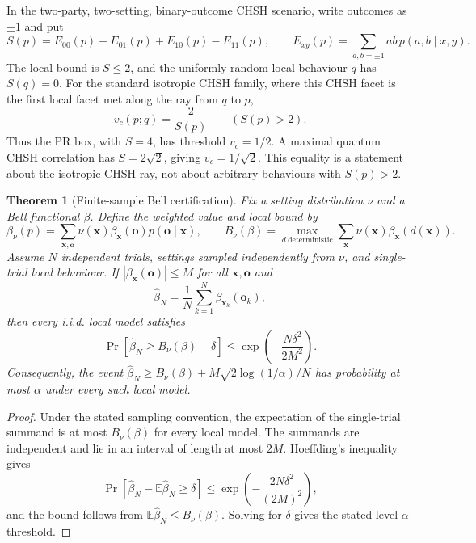 \documentclass[11pt]{article}
\theoremstyle{plain}
\newtheorem{theorem}{Theorem}[section]
\theoremstyle{definition}
\theoremstyle{remark}
\begin{document}
\begin{example}
\label{ex:chsh-visibility}
In the two-party, two-setting, binary-outcome CHSH scenario, write outcomes as
\(\pm1\) and put
\[
S(p)=E_{00}(p)+E_{01}(p)+E_{10}(p)-E_{11}(p),
\qquad
E_{xy}(p)=\sum_{a,b=\pm1}ab\,p(a,b\mid x,y).
\]
The local bound is \(S\le2\), and the uniformly random local behaviour \(q\) has
\(S(q)=0\). For the standard isotropic CHSH family, where this CHSH facet is the
first local facet met along the ray from \(q\) to \(p\),
\[
v_c(p;q)=\frac{2}{S(p)}
\qquad(S(p)>2).
\]
Thus the PR box, with \(S=4\), has threshold \(v_c=1/2\). A maximal quantum CHSH
correlation has \(S=2\sqrt2\), giving \(v_c=1/\sqrt2\). This equality is a
statement about the isotropic CHSH ray, not about arbitrary behaviours with
\(S(p)>2\).
\end{example}

\begin{theorem}[Finite-sample Bell certification]
\label{thm:finite-sample-bell}
Fix a setting distribution \(\nu\) and a Bell functional \(\beta\). Define the
weighted value and local bound by
\[
\beta_\nu(p)=
\sum_{\mathbf x,
\mathbf o}
\nu(\mathbf x)\beta_{\mathbf x}(\mathbf o)p(\mathbf o\mid\mathbf x),
\qquad
B_\nu(\beta)=
\max_{d\ \mathrm{deterministic}}
\sum_{\mathbf x}
\nu(\mathbf x)\beta_{\mathbf x}(d(\mathbf x)).
\]
Assume \(N\) independent trials, settings sampled independently from \(\nu\), and
single-trial local behaviour. If \(|\beta_{\mathbf x}(\mathbf o)|\le M\) for all \(\mathbf x,\mathbf o\) and
\[
\widehat\beta_N=\frac1N\sum_{k=1}^N
\beta_{\mathbf x_k}(\mathbf o_k),
\]
then every i.i.d. local model satisfies
\[
\Pr\!\left[
\widehat\beta_N\ge B_\nu(\beta)+\delta
\right]
\le
\exp\!\left(-\frac{N\delta^2}{2M^2}\right).
\]
Consequently, the event
\(\widehat\beta_N\ge B_\nu(\beta)+M\sqrt{2\log(1/\alpha)/N}\) has probability at
most \(\alpha\) under every such local model.
\end{theorem}

\begin{proof}
Under the stated sampling convention, the expectation of the single-trial
summand is at most \(B_\nu(\beta)\) for every local model. The summands are
independent and lie in an interval of length at most \(2M\). Hoeffding's
inequality gives
\[
\Pr\!\left[
\widehat\beta_N-\mathbb E\widehat\beta_N\ge\delta
\right]
\le
\exp\!\left(-\frac{2N\delta^2}{(2M)^2}\right),
\]
and the bound follows from \(\mathbb E\widehat\beta_N\le B_\nu(\beta)\). Solving
for \(\delta\) gives the stated level-\(\alpha\) threshold.
\end{proof}
\end{document}
